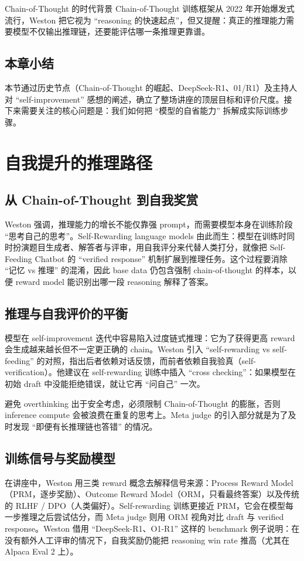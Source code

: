 \documentclass[a4paper]{article}
\begin{document}
\begin{knowledgebox}{Chain-of-Thought 的时代背景}
Chain-of-Thought 训练框架从 2022 年开始爆发式流行，Weston 把它视为 ``reasoning 的快速起点''，但又提醒：真正的推理能力需要模型不仅输出推理链，还要能评估哪一条推理更靠谱。
\end{knowledgebox}

\subsection{本章小结}
本节通过历史节点（Chain-of-Thought 的崛起、DeepSeek-R1、01/R1）及主持人对 ``self-improvement'' 感想的阐述，确立了整场讲座的顶层目标和评价尺度。接下来需要关注的核心问题是：我们如何把 ``模型的自省能力'' 拆解成实际训练步骤。

\section{自我提升的推理路径}
\subsection{从 Chain-of-Thought 到自我奖赏}
Weston 强调，推理能力的增长不能仅靠强 prompt，而需要模型本身在训练阶段 ``思考自己的思考''。Self-Rewarding language models 由此而生：模型在训练时同时扮演题目生成者、解答者与评审，用自我评分来代替人类打分，就像把 Self-Feeding Chatbot 的 ``verified response'' 机制扩展到推理任务。这个过程要消除 ``记忆 vs 推理'' 的混淆，因此 base data 仍包含强制 chain-of-thought 的样本，以便 reward model 能识别出哪一段 reasoning 解释了答案。

\subsection{推理与自我评价的平衡}
模型在 self-improvement 迭代中容易陷入过度链式推理：它为了获得更高 reward 会生成越来越长但不一定更正确的 chain。Weston 引入 ``self-rewarding vs self-feeding'' 的对照，指出后者依赖对话反馈，而前者依赖自我验真（self-verification）。他建议在 self-rewarding 训练中插入 ``cross checking''：如果模型在初始 draft 中没能拒绝错误，就让它再 ``问自己'' 一次。

\begin{warningbox}{避免 overthinking}
出于安全考虑，必须限制 Chain-of-Thought 的膨胀，否则 inference compute 会被浪费在重复的思考上。Meta judge 的引入部分就是为了及时发现 ``即便有长推理链也答错'' 的情况。
\end{warningbox}

\subsection{训练信号与奖励模型}
在讲座中，Weston 用三类 reward 概念去解释信号来源：Process Reward Model（PRM，逐步奖励）、Outcome Reward Model（ORM，只看最终答案）以及传统的 RLHF / DPO（人类偏好）。Self-rewarding 训练更接近 PRM，它会在模型每一步推理之后尝试估分，而 Meta judge 则用 ORM 视角对比 draft 与 verified response。Weston 借用 ``DeepSeek-R1、O1-R1'' 这样的 benchmark 例子说明：在没有额外人工评审的情况下，自我奖励仍能把 reasoning win rate 推高（尤其在 Alpaca Eval 2 上）。
\end{document}
